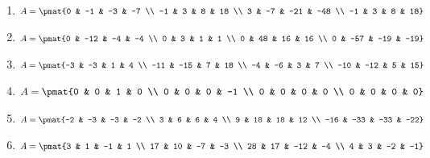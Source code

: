 \begin{enumerate}
\item

\begin{align*}
A = \pmat{0 & -1 & -3 & -7 \\ -1 & 3 & 8 & 18 \\ 3 & -7 & -21 & -48 \\ -1 & 3 & 8 & 18}
\end{align*}

\item

\begin{align*}
A = \pmat{0 & -12 & -4 & -4 \\ 0 & 3 & 1 & 1 \\ 0 & 48 & 16 & 16 \\ 0 & -57 & -19 & -19}
\end{align*}

\item

\begin{align*}
A = \pmat{-3 & -3 & 1 & 4 \\ -11 & -15 & 7 & 18 \\ -4 & -6 & 3 & 7 \\ -10 & -12 & 5 & 15}
\end{align*}

\item

\begin{align*}
A = \pmat{0 & 0 & 1 & 0 \\ 0 & 0 & 0 & -1 \\ 0 & 0 & 0 & 0 \\ 0 & 0 & 0 & 0}
\end{align*}

\item

\begin{align*}
A = \pmat{-2 & -3 & -3 & -2 \\ 3 & 6 & 6 & 4 \\ 9 & 18 & 18 & 12 \\ -16 & -33 & -33 & -22}
\end{align*}

\item

\begin{align*}
A = \pmat{3 & 1 & -1 & 1 \\ 17 & 10 & -7 & -3 \\ 28 & 17 & -12 & -4 \\ 4 & 3 & -2 & -1}
\end{align*}


\end{enumerate}
